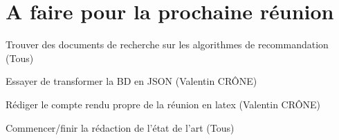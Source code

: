 \documentclass[11pt]{meetingmins}
\begin{document}
\section{A faire pour la prochaine réunion}
\begin{items}
	\item Trouver des documents de recherche sur les algorithmes de recommandation (Tous)
	\item Essayer de transformer la BD en JSON (Valentin CRÔNE)
	\item Rédiger le compte rendu propre de la réunion en latex (Valentin CRÔNE)
	\item Commencer/finir la rédaction de l'état de l'art (Tous)
\end{items}
\vspace{1cm}
\end{document}
